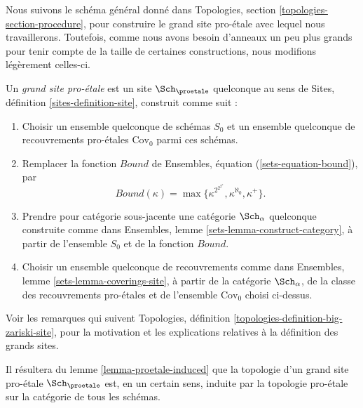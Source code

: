 \noindent
Nous suivons le schéma général donné dans
Topologies, section \ref{topologies-section-procedure},
pour construire le grand site pro-\'etale avec lequel nous travaillerons.
Toutefois, comme nous avons besoin d'anneaux un peu plus grands pour tenir compte de la taille
de certaines constructions, nous modifions légèrement celles-ci.

\begin{definition}
\label{definition-big-proetale-site}
Un {\it grand site pro-\'etale} est un site $\Sch_\proetale$ quelconque
au sens de Sites, définition \ref{sites-definition-site}, construit comme suit :
\begin{enumerate}
\item Choisir un ensemble quelconque de schémas $S_0$ et un ensemble quelconque de recouvrements pro-\'etales
$\text{Cov}_0$ parmi ces schémas.
\item Remplacer la fonction $Bound$ de
Ensembles, équation (\ref{sets-equation-bound}), par
$$
Bound(\kappa) = \max\{\kappa^{2^{2^{2^\kappa}}}, \kappa^{\aleph_0}, \kappa^+\}.
$$
\item Prendre pour catégorie sous-jacente une catégorie $\Sch_\alpha$ quelconque
construite comme dans Ensembles, lemme \ref{sets-lemma-construct-category},
à partir de l'ensemble $S_0$ et de la fonction $Bound$.
\item Choisir un ensemble quelconque de recouvrements comme dans
Ensembles, lemme \ref{sets-lemma-coverings-site}, à partir de la
catégorie $\Sch_\alpha$, de la classe des recouvrements pro-\'etales
et de l'ensemble $\text{Cov}_0$ choisi ci-dessus.
\end{enumerate}
\end{definition}

\noindent
Voir les remarques qui suivent Topologies,
définition \ref{topologies-definition-big-zariski-site},
pour la motivation et les explications relatives à la définition des grands sites.

\medskip\noindent
Il résultera du lemme \ref{lemma-proetale-induced} que la
topologie d'un grand site pro-\'etale $\Sch_\proetale$ est, en un certain sens,
induite par la topologie pro-\'etale sur la catégorie de tous les schémas.

